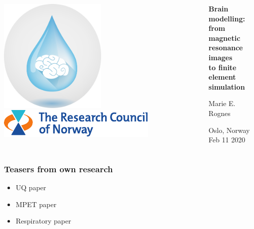 \documentclass[mathserif, aspectratio=169]{beamer}
\begin{document}
\begin{frame}
\begin{columns}
\begin{column}{0.25\textwidth}
    \vspace{1em}
    \includegraphics[width=0.5\textwidth]{graphics/waterscape_logo.png} \\
    \vspace{1em}
    \includegraphics[width=\textwidth]{graphics/rcn-logo.pdf} \\
    \end{column}
    \begin{column}{0.75\textwidth}
    {
    \centering

      \vspace{4em}

      {\bf Brain modelling: \\ from magnetic resonance images \\ to finite element simulation} \\

      \bigskip
      \bigskip
      
      Marie E. Rognes \\
      \bigskip
      \bigskip

      Oslo, Norway \\
      \medskip
      Feb 11 2020 \\
      }
    \end{column}
  \end{columns}
\end{frame}

\cleanpage

\begin{frame}
\frametitle{Teasers from own research}

\begin{itemize}
\item
  UQ paper
\item
  MPET paper
\item
  Respiratory paper
\end{itemize}
\end{frame}
\end{document}
